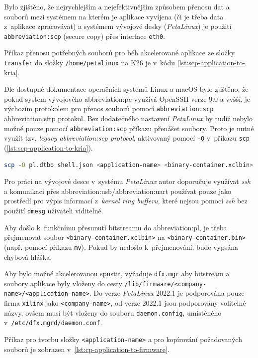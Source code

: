 \documentclass[a4paper, twoside, 11pt]{article}
\begin{document}
	Bylo zjištěno, že nejrychlejším a nejefektivnějším způsobem přenosu dat a souborů mezi systémem na kterém je aplikace vyvíjena (či je třeba data z~aplikace zpracovávat) a systémem vývojové desky (\textit{PetaLinux}) je použití \texttt{\gls{abbreviation:scp}} (secure copy) přes interface \texttt{eth0}.\par
	Příkaz přenosu potřebných souborů pro běh akcelerované aplikace ze složky \texttt{transfer} do složky \texttt{/home/petalinux} na K26 je v~kódu \ref{lst:scp-application-to-kria}.\par
	Dle dostupné dokumentace operačních systémů Linux a macOS bylo zjištěno, že pokud systém vývojového \gls{abbreviation:pc} využívá OpenSSH verze 9.0 a vyšší, je výchozím protokolem pro přenos souborů pomocí \texttt{\gls{abbreviation:scp}} \gls{abbreviation:sftp} protokol. Bez dodatečného nastavení \textit{PetaLinux} by tudíž nebylo možné pouze pomocí \texttt{\gls{abbreviation:scp}} příkazu přenášet soubory. Proto je nutné využít tzv. \textit{legacy \gls{abbreviation:scp} protocol}, aktivovaný pomocí \texttt{-O} v~příkazu \texttt{scp} (\ref{lst:scp-application-to-kria}).\par

	\begin{lstlisting}[language={sh}, caption={Příkaz pro přesun souborů pomocí \gls{abbreviation:scp} ze systému, kde byla aplikace vyvíjena do systému PetaLinux na K26 SOM.}, label={lst:scp-application-to-kria}, morekeywords={scp}]
scp -O pl.dtbo shell.json <application-name> <binary-container.xclbin> root@<ip-address-of-eth-interface>:/home/petalinux
\end{lstlisting}

	Pro práci na vývojové desce v~systému \textit{PetaLinux} autor doporučuje využívat \textit{ssh} a komunikaci přes \gls{abbreviation:usb}/\gls{abbreviation:uart} používat pouze jako prostředí pro výpis informací z~\textit{kernel ring bufferu}, které nejsou pomocí \textit{ssh} bez použití \texttt{dmesg} uživateli viditelné.\par
	Aby došlo k~funkčnímu přesunutí bitstreamu do \gls{abbreviation:pl}, je třeba přejmenovat soubor \texttt{<binary-container.xclbin>} na \texttt{<binary-container.bin>} (např. pomocí příkazu \texttt{mv}). Pokud by nedošlo k~přejmenování, bude vypsána chybová hláška.\par
	Aby bylo možné akcelerovanou spustit, vyžaduje \texttt{dfx.mgr} aby bitstream a soubory aplikace byly vloženy do cesty \texttt{/lib/firmware/<company-name>/<application-name>}. Do verze \textit{PetaLinux} 2022.1 je podporována pouze firma \texttt{xilinx} jako \texttt{<company-name>}, od verze 2022.1 jsou podporovány volitelné názvy, ovšem musí být vloženy do souboru \texttt{daemon.config}, umístěného v~\texttt{/etc/dfx.mgrd/daemon.conf}. \cite{xilinx-github-vitis-tutorials-step-2-create-the-software-components} \cite{xilinx-github-dfx-mgr}\par
	Příkaz pro tvorbu složky \texttt{<application-name>} a pro kopírování požadovaných souborů je zobrazen v~\ref{lst:cp-application-to-firmware}.\par
\end{document}
